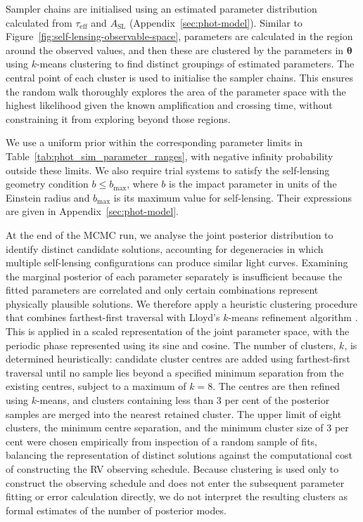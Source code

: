 \documentclass[fleqn,usenatbib]{mnras}
\begin{document}
Sampler chains are initialised using an estimated parameter distribution calculated from $\tau_\mathrm{eff}$ and $A_\mathrm{SL}$ (Appendix~\ref{sec:phot-model}). Similar to Figure~\ref{fig:self-lensing-observable-space}, parameters are calculated in the region around the observed values, and then these are clustered by the parameters in $\boldsymbol{\theta}$ using $k$-means clustering to find distinct groupings of estimated parameters. The central point of each cluster is used to initialise the sampler chains. This ensures the random walk thoroughly explores the area of the parameter space with the highest likelihood given the known amplification and crossing time, without constraining it from exploring beyond those regions.

We use a uniform prior within the corresponding parameter limits in Table~\ref{tab:phot_sim_parameter_ranges}, with negative infinity probability outside these limits. We also require trial systems to satisfy the self-lensing geometry condition $b \leq b_\mathrm{max}$, where $b$ is the impact parameter in units of the Einstein radius and $b_\mathrm{max}$ is its maximum value for self-lensing. Their expressions are given in Appendix~\ref{sec:phot-model}.

At the end of the MCMC run, we analyse the joint posterior distribution to identify distinct candidate solutions, accounting for degeneracies in which multiple self-lensing configurations can produce similar light curves. Examining the marginal posterior of each parameter separately is insufficient because the fitted parameters are correlated and only certain combinations represent physically plausible solutions. We therefore apply a heuristic clustering procedure that combines farthest-first traversal \citep{gonzalez_clustering_1985} with Lloyd’s $k$-means refinement algorithm \citep{lloyd_least_1982}. This is applied in a scaled representation of the joint parameter space, with the periodic phase represented using its sine and cosine. The number of clusters, $k$, is determined heuristically: candidate cluster centres are added using farthest-first traversal until no sample lies beyond a specified minimum separation from the existing centres, subject to a maximum of $k=8$. The centres are then refined using $k$-means, and clusters containing less than 3 per cent of the posterior samples are merged into the nearest retained cluster. The upper limit of eight clusters, the minimum centre separation, and the minimum cluster size of 3 per cent were chosen empirically from inspection of a random sample of fits, balancing the representation of distinct solutions against the computational cost of constructing the RV observing schedule. Because clustering is used only to construct the observing schedule and does not enter the subsequent parameter fitting or error calculation directly, we do not interpret the resulting clusters as formal estimates of the number of posterior modes.
\end{document}
